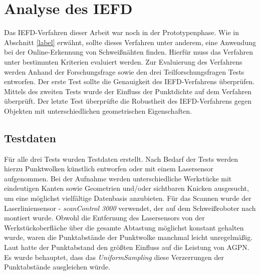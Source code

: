 \chapter{Analyse des IEFD}
Das IEFD-Verfahren dieser Arbeit war noch in der Prototypenphase. Wie in Abschnitt \ref{label} erwähnt, sollte dieses Verfahren unter anderem, eine Anwendung bei der Online-Erkennung von Schweißnähten finden. Hierfür muss das Verfahren unter bestimmten Kriterien evaluiert werden. Zur Evaluierung des Verfahrens werden Anhand der Forschungsfrage sowie den drei Teilforschungsfragen Tests entworfen. Der erste Test sollte die Genauigkeit des IEFD-Verfahrens überprüfen. Mittels des zweiten Tests wurde der Einfluss der Punktdichte auf dem Verfahren überprüft. Der letzte Test überprüfte die Robustheit des IEFD-Verfahrens gegen Objekten mit unterschiedlichen geometrischen Eigenschaften.

\section{Testdaten}
Für alle drei Tests wurden Testdaten erstellt. Nach Bedarf der Tests werden hierzu Punktwolken künstlich entworfen oder mit einem Lasersensor aufgenommen. Bei der Aufnahme werden unterschiedliche Werkstücke mit eindeutigen Kanten sowie Geometrien und/oder sichtbaren Knicken ausgesucht, um eine möglichst vielfältige Datenbasis anzubieten. Für das Scannen wurde der Laserliniensensor - \textit{scanControl 3000} verwendet, der auf dem Schweißroboter nach \textcite[39]{savla_intelligente_2022} montiert wurde. Obwohl die Entfernung des Lasersensors von der Werkstückoberfläche über die gesamte Abtastung möglichst konstant gehalten wurde, waren die Punktabstände der Punktwolke manchmal leicht unregelmäßig. Laut \textcite[9]{ni_edge_2016} hatte der Punktabstand den größten Einfluss auf die Leistung von AGPN. Es wurde behauptet, dass das \textit{UniformSampling} diese Verzerrungen der Punktabstände ausgleichen würde. 

